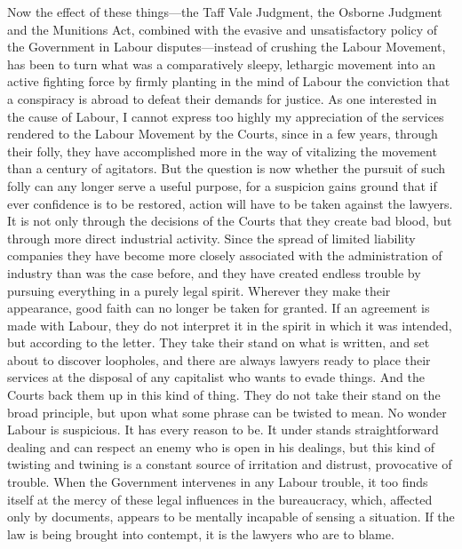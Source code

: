 \documentclass{book}
\begin{document}
Now the effect of these things—the Taff Vale Judgment, the Osborne Judgment and the Munitions Act, combined with the evasive and unsatisfactory policy of the Government in Labour disputes—instead of crushing the Labour Movement, has been to turn what was a comparatively sleepy, lethargic movement into an active fighting force by firmly planting in the mind of Labour the conviction that a conspiracy is abroad to defeat their demands for justice. As one interested in the cause of Labour, I cannot express too highly my appreciation of the services rendered to the Labour Movement by the Courts, since in a few years, through their folly, they have accomplished more in the way of vitalizing the movement than a century of agitators. But the question is now whether the pursuit of such folly can any longer serve a useful purpose, for a suspicion gains ground that if ever confidence is to be restored, action will have to be taken against the lawyers. It is not only through the decisions of the Courts that they create bad blood, but through more direct industrial activity. Since the spread of limited liability companies they have become more closely associated with the administration of industry than was the case before, and they have created endless trouble by pursuing everything in a purely legal spirit. Wherever they make their appearance, good faith can no longer be taken for granted. If an agreement is made with Labour, they do not interpret it in the spirit in which it was intended, but according to the letter. They take their stand on what is written, and set about to discover loopholes, and there are always lawyers ready to place their services at the disposal of any capitalist who wants to evade things. And the Courts back them up in this kind of thing. They do not take their stand on the broad principle, but upon what some phrase can be twisted to mean. No wonder Labour is suspicious. It has every reason to be. It under stands straightforward dealing and can respect an enemy who is open in his dealings, but this kind of twisting and twining is a constant source of irritation and distrust, provocative of trouble. When the Government intervenes in any Labour trouble, it too finds itself at the mercy of these legal influences in the bureaucracy, which, affected only by documents, appears to be mentally incapable of sensing a situation. If the law is being brought into contempt, it is the lawyers who are to blame.
\end{document}
